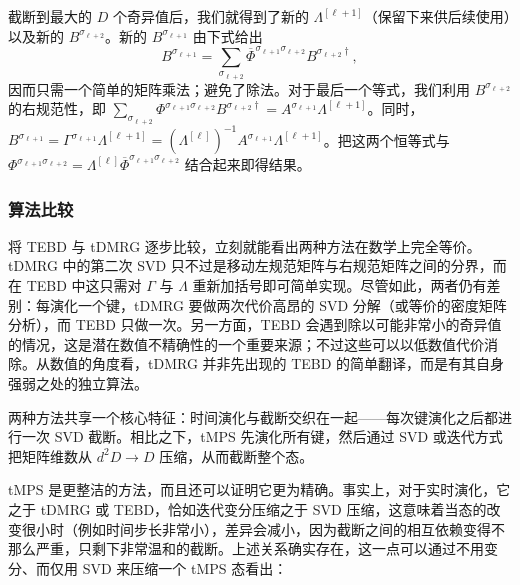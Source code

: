 \documentclass[a4paper,10pt,oneside,onecolumn,1p,times]{elsarticle}
\begin{document}
截断到最大的 $D$ 个奇异值后，我们就得到了新的 $\Lambda^{[\ell+1]}$（保留下来供后续使用）以及新的 $B^{\sigma_{\ell+2}}$。新的 $B^{\sigma_{\ell+1}}$
由下式给出
\begin{equation}
B^{\sigma_{\ell+1}} = \sum_{\sigma_{\ell+2}}  \overline{\Phi}^{\sigma_{\ell+1}\sigma_{\ell+2}}
B^{\sigma_{\ell+2}\dagger},
\end{equation}
因而只需一个简单的矩阵乘法；避免了除法。对于最后一个等式，我们利用 $B^{\sigma_{\ell+2}}$ 的右规范性，即 $\sum_{\sigma_{\ell+2}} \Phi^{\sigma_{\ell+1}\sigma_{\ell+2}} B^{\sigma_{\ell+2}\dagger} =  A^{\sigma_{\ell+1}} \Lambda^{[\ell+1]}$。同时，$B^{\sigma_{\ell+1}} = \Gamma^{\sigma_{\ell+1}} \Lambda^{[\ell+1]} = (\Lambda^{[\ell]})^{-1} A^{\sigma_{\ell+1}}  \Lambda^{[\ell+1]}$。把这两个恒等式与 $\Phi^{\sigma_{\ell+1} \sigma_{\ell+2}} = \Lambda^{[\ell]} \overline{\Phi}^{\sigma_{\ell+1} \sigma_{\ell+2}}$ 结合起来即得结果。

\subsubsection{算法比较}
将 TEBD 与 tDMRG 逐步比较，立刻就能看出两种方法在数学上完全等价。tDMRG 中的第二次 SVD 只不过是移动左规范矩阵与右规范矩阵之间的分界，而在 TEBD 中这只需对 $\Gamma$ 与 $\Lambda$ 重新加括号即可简单实现。尽管如此，两者仍有差别：每演化一个键，tDMRG 要做两次代价高昂的 SVD 分解（或等价的密度矩阵分析），而 TEBD 只做一次。另一方面，TEBD 会遇到除以可能非常小的奇异值的情况，这是潜在数值不精确性的一个重要来源；不过这些可以\cite{Hastings09}以低数值代价消除。从数值的角度看，tDMRG 并非先出现的 TEBD 的简单翻译，而是有其自身强弱之处的独立算法。

两种方法共享一个核心特征：时间演化与截断交织在一起——每次键演化之后都进行一次 SVD 截断。相比之下，tMPS 先演化所有键，然后通过 SVD 或迭代方式把矩阵维数从 $d^2 D \rightarrow D$ 压缩，从而截断整个态。 

tMPS 是更整洁的方法，而且还可以证明它更为精确。事实上，对于实时演化，它之于 tDMRG 或 TEBD，恰如迭代变分压缩之于 SVD 压缩，这意味着当态的改变很小时（例如时间步长非常小），差异会减小，因为截断之间的相互依赖变得不那么严重，只剩下非常温和的截断。上述关系确实存在，这一点可以通过不用变分、而仅用 SVD 来压缩一个 tMPS 态看出： 
\end{document}
